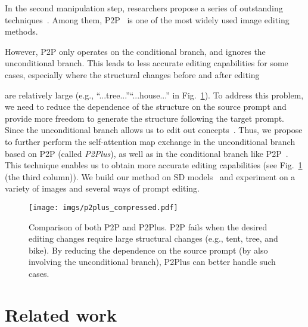 \documentclass[twocolumn]{svjour3}          \smartqed  \usepackage{graphicx}
\begin{document}
In the second manipulation step, researchers propose a series of outstanding techniques~\citep{Kawar2022ImagicTR,meng2021sdedit,cao2023masactrl,zhang2023adding,couairon2022diffedit,mou2023dragondiffusion,jia2023taming,zhang2023continuous,qiu2023controlling,levin2023differential}. Among them, P2P~\citep{hertz2022prompt} is one of the most widely used image editing methods. 

However, P2P only operates on the conditional branch, and ignores the unconditional branch. This leads to less accurate editing capabilities for some cases, especially where the structural changes before and after editing 

are relatively large (e.g., “...tree...”“...house...” in Fig.~\ref{fig:p2plus}).  To address this problem, we need to reduce the dependence of the structure on the source prompt and provide more freedom to generate the structure following the target prompt. Since the unconditional branch allows us to edit out  concepts~\citep{armandpour2023re,Tumanyan_2023_CVPR}. Thus, we propose to further perform the self-attention map exchange in  the unconditional branch based on P2P (called \textit{P2Plus}), as well as in the conditional branch like P2P~\citep{hertz2022prompt}. This technique enables us to obtain more accurate editing capabilities (see Fig.~\ref{fig:p2plus} (the third column)). We build our method on SD models~\citep{rombach2021highresolution} and experiment on a variety of images and several ways of prompt editing.

\begin{figure}[t]
    \centering
    \texttt{[image: imgs/p2plus\_compressed.pdf]}
        \caption{
Comparison of both P2P and P2Plus. P2P fails when the desired editing changes require large structural changes (e.g., tent, tree, and bike). By reducing the dependence on the source prompt (by also involving the unconditional branch), P2Plus can better handle such cases.
        }
    \label{fig:p2plus}
\end{figure}

\section{Related work}
\end{document}
